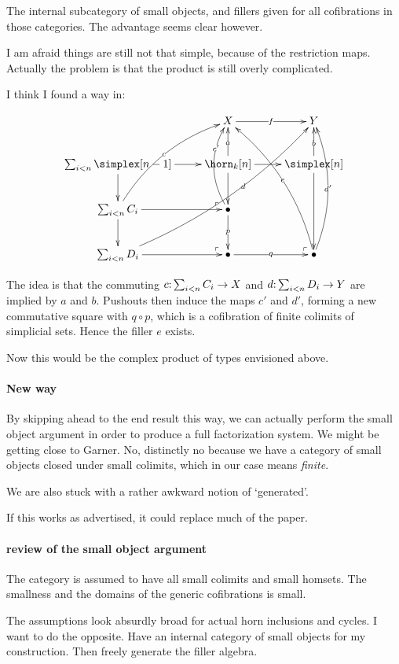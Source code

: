 \documentclass[csh.tex]{subfiles}
\makeatletter
\newcommand\pushout{\ar@{}[dr]|(.9)\ulcorner}
\makeatother
\begin{document}
The internal subcategory of small objects, and fillers given for all cofibrations in those categories. The advantage seems clear however.

I am afraid things are still not that simple, because of the restriction maps. Actually the problem is that the product is still overly complicated.

I think I found a way in:

\[ \xymatrix{
& X\ar[r]|f & Y\\
%
\sum_{i<n} \simplex[n-1] \ar[r]\ar[d]\pushout & 
\horn_k[n] \ar[u]|a\ar[d]\ar[r] & 
\simplex[n] \ar[dd]\ar[u]|b \\
%
\sum_{i<n} C_i \ar@/^{3ex}/[uur]|c \ar[r]\ar[d]\pushout & 
\bullet \ar@/^{3ex}/[uu]|(.7){c'} \ar[d]|p\pushout \\
%
\sum_{i<n} D_i \ar@/_{3ex}/[uuurr]|(.6)d \ar[r] & 
\bullet \ar[r]|q & \bullet \ar@/_{3ex}/[uuu]|{d'} \ar@/_{3ex}/[uuul]|{e} 
}\]

The idea is that the commuting $c\mathord : \sum_{i<n} C_i\to X$ and $d\mathord : \sum_{i<n} D_i\to Y$ are implied by $a$ and $b$. Pushouts then induce the maps $c'$ and $d'$, forming a new commutative square with $q\circ p$, which is a cofibration of finite colimits of simplicial sets. Hence the filler $e$ exists.

Now this would be the complex product of types envisioned above.

\paragraph{New way}
By skipping ahead to the end result this way, we can actually perform the small object argument in order to produce a full factorization system. We might be getting close to Garner. No, distinctly no because we have a category of small objects closed under small colimits, which in our case means \emph{finite}.

We are also stuck with a rather awkward notion of `generated'. 

If this works as advertised, it could replace much of the paper.

\paragraph{review of the small object argument}
The category is assumed to have all small colimits and small homsets. The smallness and the domains of the generic cofibrations is small. 

The assumptions look absurdly broad for actual horn inclusions and cycles. I want to do the opposite. Have an internal category of small objects for my construction. Then freely generate the filler algebra.
\end{document}
